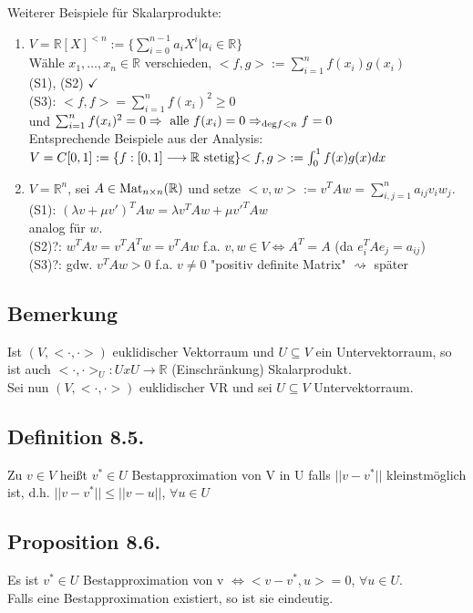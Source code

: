 \documentclass[a4paper, 12pt]{extarticle}
\newcommand{\tn}[1]{\textnormal {#1}}
\begin{document}
Weiterer Beispiele für Skalarprodukte:
\begin{enumerate}[label=\arabic*)]
	\item $V = \mathbb{R}[X]^{< n} := \{\sum_{i=0}^{n-1}a_iX^i | a_i \in \mathbb{R}\}$\\
	Wähle $x_1, \dots, x_n \in \mathbb{R}$ verschieden, ${<f, g>} := \sum_{i=1}^{n}f(x_i)g(x_i)$\\
	(S1), (S2) $\checkmark$\\
	(S3): ${<f, f>} = \sum_{i=1}^{n}f(x_i)^2 \geq 0$\\
	und $\sum_{i=1}^{n}f(x_i)^2 = 0 \Rightarrow \tn{ alle } f(x_i) = 0 \Rightarrow_{\tn{deg}f<n} f = 0$\\
	Entsprechende Beispiele aus der Analysis:\\
	$V = C[0,1] := \{f:[0,1] \longrightarrow \mathbb{R} \tn{ stetig}\}\\
	{<f, g>} := \int_{0}^{1}f(x)g(x)dx$
	\item $V = \mathbb{R}^n$, sei $A \in \tn{Mat}_{n\times n}(\mathbb{R})$ und setze ${<v, w>} := v^TAw = \sum_{i, j=1}^{n}a_{ij}v_iw_j$.\\
	(S1): $(\lambda v+\mu v')^TAw = \lambda v^TAw+\mu v'^TAw$\\
	analog für $w$.\\
	(S2)?: $w^TAv = v^TA^Tw = v^TAw$ f.a. $v, w \in V \Leftrightarrow A^T = A$ (da $e_i^TAe_j=a_{ij}$)\\
	(S3)?: gdw. $v^TAw > 0$ f.a. $v \neq 0$ "positiv definite Matrix" $\rightsquigarrow$ später
\end{enumerate}
\subsection*{Bemerkung}
Ist $(V, <\cdot , \cdot>)$ euklidischer Vektorraum und $U \subseteq V$ ein Untervektorraum, so ist auch $<\cdot , \cdot>_U:UxU \to \mathbb R$ (Einschränkung) Skalarprodukt. \\
Sei nun $(V, <\cdot , \cdot>)$ euklidischer VR und sei $U \subseteq V$ Untervektorraum.
\subsection*{Definition 8.5.} Zu $v\in V$ heißt $v^*\in U$ Bestapproximation von V in U falls $||v-v^*||$ kleinstmöglich ist, d.h. $||v-v^*|| \leq ||v-u||$, $\forall u \in U$
\subsection*{Proposition 8.6.}
Es ist $v^* \in U$ Bestapproximation von v $\Leftrightarrow <v-v^* , u> = 0$, $\forall u \in U$. \\
Falls eine Bestapproximation existiert, so ist sie eindeutig.
\end{document}
